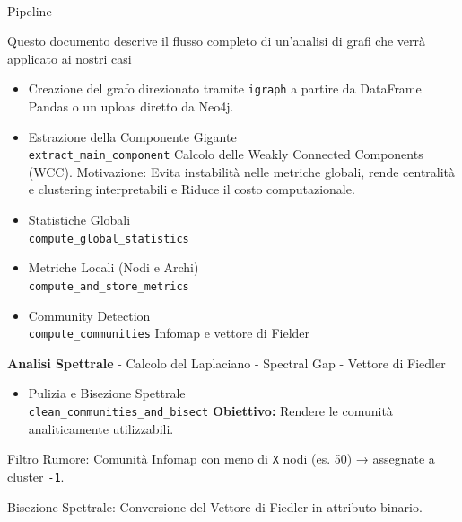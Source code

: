 \documentclass[
  italian,
  a4paper,
]{article}
\makeatletter
\let\oldparagraph\paragraph
\renewcommand{\paragraph}{
    \@ifstar
      \xxxParagraphStar
      \xxxParagraphNoStar
  }
\newcommand{\xxxParagraphStar}[1]{\oldparagraph*{#1}\mbox{}}
\newcommand{\xxxParagraphNoStar}[1]{\oldparagraph{#1}\mbox{}}
\providecommand{\tightlist}{%
  \setlength{\itemsep}{0pt}\setlength{\parskip}{0pt}}
\makeatother
\begin{document}
\paragraph{Pipeline}\label{pipeline}

Questo documento descrive il flusso completo di un'analisi di grafi che
verrà applicato ai nostri casi

\begin{itemize}
\item
  Creazione del grafo direzionato tramite \texttt{igraph} a partire da
  DataFrame Pandas o un uploas diretto da Neo4j.
\item
  Estrazione della Componente Gigante\\
  \texttt{extract\_main\_component} Calcolo delle Weakly Connected
  Components (WCC). Motivazione: Evita instabilità nelle metriche
  globali, rende centralità e clustering interpretabili e Riduce il
  costo computazionale.
\item
  Statistiche Globali\\
  \texttt{compute\_global\_statistics}
\item
  Metriche Locali (Nodi e Archi)\\
  \texttt{compute\_and\_store\_metrics}
\item
  Community Detection\\
  \texttt{compute\_communities} Infomap e vettore di Fielder
\end{itemize}

\textbf{Analisi Spettrale} - Calcolo del Laplaciano - Spectral Gap -
Vettore di Fiedler

\begin{itemize}
\tightlist
\item
  Pulizia e Bisezione Spettrale\\
  \texttt{clean\_communities\_and\_bisect} \textbf{Obiettivo:} Rendere
  le comunità analiticamente utilizzabili.
\end{itemize}

Filtro Rumore: Comunità Infomap con meno di \texttt{X} nodi (es. 50) →
assegnate a cluster \texttt{-1}.

Bisezione Spettrale: Conversione del Vettore di Fiedler in attributo
binario.
\end{document}
